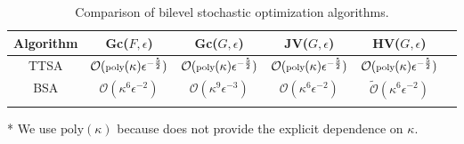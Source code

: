\documentclass{osudissert96}
\begin{document}
\begin{table*}[!t]
\vspace{-0.25cm}
 \centering
 \caption{Comparison of bilevel stochastic optimization algorithms.}
\small
 \vspace{0.1cm}
 \begin{threeparttable}
  \begin{tabular}{|c|c|c|c|c|c|}
   \hline
Algorithm & Gc($F,\epsilon$) & Gc($G,\epsilon$) & JV($G,\epsilon$) &  HV($G,\epsilon$)  
\\\hline\hline
TTSA \cite{hong2020two}  &$ \mathcal{O}(\text{\scriptsize poly}(\kappa)\epsilon^{-\frac{5}{2}})$\tnote{*} & $\mathcal{O}(\text{\scriptsize poly}(\kappa)\epsilon^{-\frac{5}{2}})$& $\mathcal{O}(\text{\scriptsize poly}(\kappa)\epsilon^{-\frac{5}{2}})$&$\mathcal{O}(\text{\scriptsize poly}(\kappa)\epsilon^{-\frac{5}{2}})$
\\ \hline
BSA \cite{ghadimi2018approximation}  & $\mathcal{O}(\kappa^6\epsilon^{-2})$ & $\mathcal{O}(\kappa^9\epsilon^{-3})$ &  $\mathcal{O}\left(\kappa^6\epsilon^{-2}\right)$& $\mathcal{\widetilde O}\left(\kappa^6\epsilon^{-2}\right)$
\\ \hline
   \cellcolor{blue!15}{stocBiO (this thesis)} & \cellcolor{blue!15}{$\mathcal{O}(\kappa^5\epsilon^{-2})$} & \cellcolor{blue!15}{$\mathcal{O}(\kappa^9\epsilon^{-2})$ } & \cellcolor{blue!15}{$\mathcal{ O}\left(\kappa^5\epsilon^{-2}\right)$} & \cellcolor{blue!15}{$\mathcal{\widetilde O}\left(\kappa^6\epsilon^{-2}\right)$} \\ \hline 
  \end{tabular}\label{tab:stochastic}
   \begin{tablenotes}
  \item[*] We use $\text{poly}(\kappa)$ because \cite{hong2020two} does not provide the explicit dependence on $\kappa$.
 \end{tablenotes}
 \end{threeparttable}
 \vspace{-0.5cm}
\end{table*}
\end{document}
